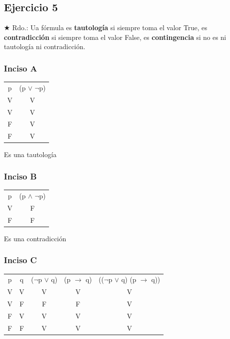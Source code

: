 	\subsection{Ejercicio 5}
	$\bigstar$ Rdo.: Ua fórmula es \textbf{tautología} si siempre toma el valor True, es \textbf{contradicción} si siempre toma el valor False,
	es \textbf{contingencia} si no es ni tautología ni contradicción.
	
	\subsubsection{Inciso A}
	\begin{tabular}{c|c}
		p & (p $\vee$ $\neg$p) \\
		V & V               \\
		V & V               \\
		F & V               \\
		F & V
	\end{tabular}
	
	Es una tautología
	
	\subsubsection{Inciso B}
	\begin{tabular}{c|c}
		p & (p $\wedge$ $\neg$p) \\
		V & F               \\
		F & F
	\end{tabular}
	
	Es una contradicción
	
	\subsubsection{Inciso C}
	\begin{tabular}{c|c|c|c|c}
		p & q & ($\neg$p $\vee$ q) & (p $\rightarrow$ q) & (($\neg$p $\vee$ q) \Iff (p $\rightarrow$ q)) \\
		V & V & V                  & V                   & V                                              \\
		V & F & F                  & F                   & V                                              \\
		F & V & V                  & V                   & V                                              \\
		F & F & V                  & V                   & V                                              \\
	\end{tabular}
	
